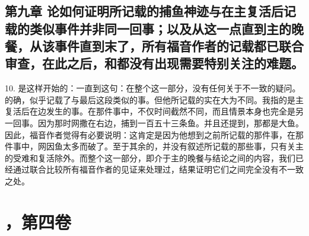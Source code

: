 
\section{}


\subsection{第九章 论如何证明所记载的捕鱼神迹与在主复活后记载的类似事件并非同一回事；以及从这一点直到主的晚餐，从该事件直到末了，所有福音作者的记载都已联合审查，在此之后，和都没有出现需要特别关注的难题。}

10. 是这样开始的：一直到这句：在整个这一部分，没有任何关于不一致的疑问。的确，似乎记载了与最后这段类似的事。但他所记载的实在大为不同。我指的是主复活后在边发生的事。在那件事中，不仅时间截然不同，而且情景本身也完全是另一回事。因为那时网撒在右边，捕到一百五十三条鱼。并且还提到，那都是大鱼。因此，福音作者觉得有必要说明：这肯定是因为他想到之前所记载的那件事，在那件事中，网因鱼太多而破了。至于其余的，并没有叙述所记载的那些事，只有关主的受难和复活除外。而整个这一部分，即介于主的晚餐与结论之间的内容，我们已经通过联合比较所有福音作者的见证来处理过，结果证明它们之间完全没有不一致之处。\par



\section{，第四卷}

